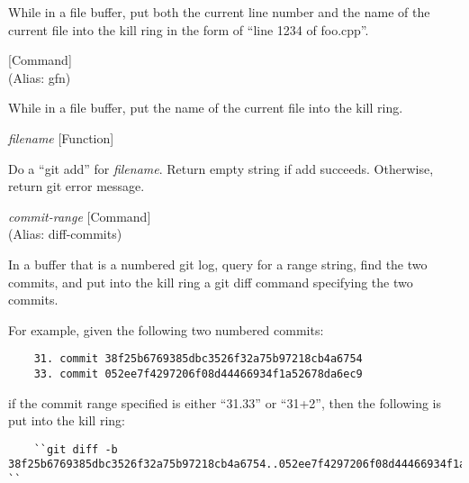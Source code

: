 \begin{doc-string}
While in a file buffer, put both the current line number and the name of the current
file into the kill ring in the form of ``line 1234 of foo.cpp''.
\end{doc-string}

\vspace{1em}
\noindent
{}
\usebox{\funcname}
 \hfill [Command]\\%
 (Alias: gfn)

\begin{doc-string}
While in a file buffer, put the name of the current file into the kill ring.
\end{doc-string}

\vspace{1em}
\noindent
{}
\usebox{\funcname}\emph{filename}
 \hfill [Function]

\begin{doc-string}
Do a ``git add'' for \emph{filename}.  Return empty string if add succeeds.  Otherwise,
return git error message.
\end{doc-string}

\vspace{1em}
\noindent
{}
\usebox{\funcname}\emph{commit-range}
 \hfill [Command]\\%
 (Alias: diff-commits)

\begin{doc-string}
In a buffer that is a numbered git log, query for a range string, find the two
commits, and put into the kill ring a git diff command specifying the two commits.

For example, given the following two numbered commits:

\small{\begin{verbatim}
    31. commit 38f25b6769385dbc3526f32a75b97218cb4a6754
    33. commit 052ee7f4297206f08d44466934f1a52678da6ec9
\end{verbatim}}

if the commit range specified is either ``31.33'' or ``31+2'', then the following
is put into the kill ring:

\small{\begin{verbatim}
    ``git diff -b 38f25b6769385dbc3526f32a75b97218cb4a6754..052ee7f4297206f08d44466934f1a52678da6ec9 ``
\end{verbatim}}
\end{doc-string}

